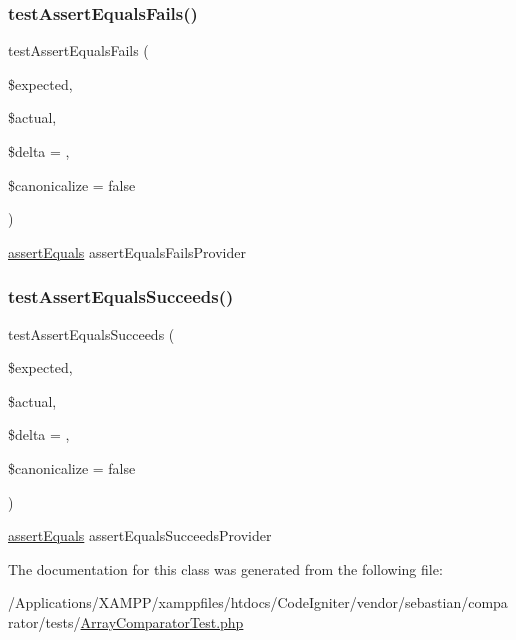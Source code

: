 \subsubsection{\texorpdfstring{test\+Assert\+Equals\+Fails()}{testAssertEqualsFails()}}
{\footnotesize\ttfamily test\+Assert\+Equals\+Fails (\begin{DoxyParamCaption}\item[{}]{\$expected,  }\item[{}]{\$actual,  }\item[{}]{\$delta = {},  }\item[{}]{\$canonicalize = {\ttfamily false} }\end{DoxyParamCaption})}

\mbox{\hyperlink{_functions_8php_a441ec5f09711b6271edda774132eec5f}{assert\+Equals}}  assert\+Equals\+Fails\+Provider \mbox{\label{class_sebastian_bergmann_1_1_comparator_1_1_array_comparator_test_a2028fcfb540175cac3029f13050d5fb0}} 
\subsubsection{\texorpdfstring{test\+Assert\+Equals\+Succeeds()}{testAssertEqualsSucceeds()}}
{\footnotesize\ttfamily test\+Assert\+Equals\+Succeeds (\begin{DoxyParamCaption}\item[{}]{\$expected,  }\item[{}]{\$actual,  }\item[{}]{\$delta = {},  }\item[{}]{\$canonicalize = {\ttfamily false} }\end{DoxyParamCaption})}

\mbox{\hyperlink{_functions_8php_a441ec5f09711b6271edda774132eec5f}{assert\+Equals}}  assert\+Equals\+Succeeds\+Provider 

The documentation for this class was generated from the following file\+:\begin{DoxyCompactItemize}
\item 
/\+Applications/\+X\+A\+M\+P\+P/xamppfiles/htdocs/\+Code\+Igniter/vendor/sebastian/comparator/tests/\mbox{\hyperlink{_array_comparator_test_8php}{Array\+Comparator\+Test.\+php}}\end{DoxyCompactItemize}
